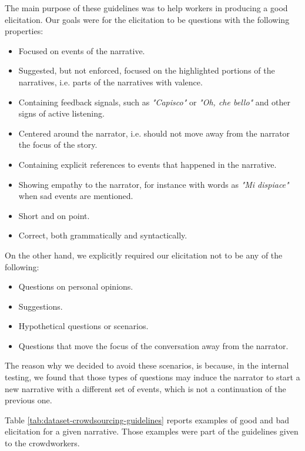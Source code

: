 The main purpose of these guidelines was to help workers in producing a good elicitation. Our goals were for the elicitation to be questions with the following properties:
\begin{itemize}
    \item Focused on events of the narrative.
    \item Suggested, but not enforced, focused on the highlighted portions of the narratives, i.e. parts of the narratives with valence.
    \item Containing feedback signals, such as \emph{"Capisco"} or \emph{"Oh, che bello"} and other signs of active listening.
    \item Centered around the narrator, i.e. should not move away from the narrator the focus of the story.
    \item Containing explicit references to events that happened in the narrative.
    \item Showing empathy to the narrator, for instance with words as \emph{"Mi dispiace"} when sad events are mentioned.
    \item Short and on point.
    \item Correct, both grammatically and syntactically.
\end{itemize}
On the other hand, we explicitly required our elicitation not to be any of the following:
\begin{itemize}
    \item Questions on personal opinions.
    \item Suggestions.
    \item Hypothetical questions or scenarios.
    \item Questions that move the focus of the conversation away from the narrator.
\end{itemize}
The reason why we decided to avoid these scenarios, is because, in the internal testing, we found that those types of questions may induce the narrator to start a new narrative with a different set of events, which is not a continuation of the previous one. 

Table \ref{tab:dataset-crowdsourcing-guidelines} reports examples of good and bad elicitation for a given narrative. Those examples were part of the guidelines given to the crowdworkers.
